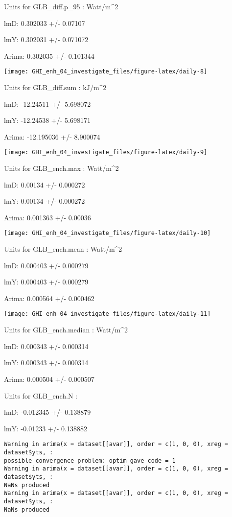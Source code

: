 \documentclass[
  10pt,
  a4paper,oneside]{article}
\begin{document}
Units for GLB\_diff.p\_95 : Watt/m\^{}2

lmD: 0.302033 +/- 0.07107

lmY: 0.302031 +/- 0.071072

Arima: 0.302035 +/- 0.101344

\begin{center}\texttt{[image: GHI\_enh\_04\_investigate\_files/figure-latex/daily-8]} \end{center}

Units for GLB\_diff.sum : kJ/m\^{}2

lmD: -12.24511 +/- 5.698072

lmY: -12.24538 +/- 5.698171

Arima: -12.195036 +/- 8.900074

\begin{center}\texttt{[image: GHI\_enh\_04\_investigate\_files/figure-latex/daily-9]} \end{center}

Units for GLB\_ench.max : Watt/m\^{}2

lmD: 0.00134 +/- 0.000272

lmY: 0.00134 +/- 0.000272

Arima: 0.001363 +/- 0.00036

\begin{center}\texttt{[image: GHI\_enh\_04\_investigate\_files/figure-latex/daily-10]} \end{center}

Units for GLB\_ench.mean : Watt/m\^{}2

lmD: 0.000403 +/- 0.000279

lmY: 0.000403 +/- 0.000279

Arima: 0.000564 +/- 0.000462

\begin{center}\texttt{[image: GHI\_enh\_04\_investigate\_files/figure-latex/daily-11]} \end{center}

Units for GLB\_ench.median : Watt/m\^{}2

lmD: 0.000343 +/- 0.000314

lmY: 0.000343 +/- 0.000314

Arima: 0.000504 +/- 0.000507

Units for GLB\_ench.N :

lmD: -0.012345 +/- 0.138879

lmY: -0.01233 +/- 0.138882

\begin{verbatim}
Warning in arima(x = dataset[[avar]], order = c(1, 0, 0), xreg = dataset$yts, :
possible convergence problem: optim gave code = 1
Warning in arima(x = dataset[[avar]], order = c(1, 0, 0), xreg = dataset$yts, :
NaNs produced
Warning in arima(x = dataset[[avar]], order = c(1, 0, 0), xreg = dataset$yts, :
NaNs produced
\end{verbatim}
\end{document}
